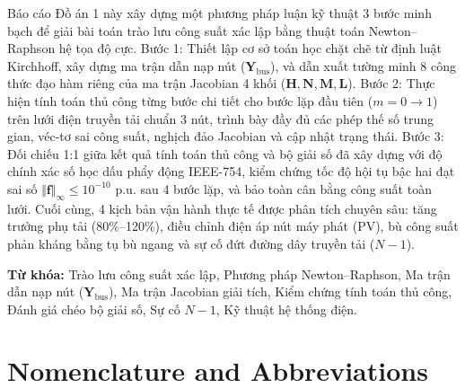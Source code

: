 \documentclass[12pt,a4paper,oneside]{report}
\begin{document}
Báo cáo Đồ án 1 này xây dựng một phương pháp luận kỹ thuật 3 bước minh bạch để giải bài toán trào lưu công suất xác lập bằng thuật toán Newton--Raphson hệ tọa độ cực. Bước 1: Thiết lập cơ sở toán học chặt chẽ từ định luật Kirchhoff, xây dựng ma trận dẫn nạp nút ($\mathbf{Y}_{\text{bus}}$), và dẫn xuất tường minh 8 công thức đạo hàm riêng của ma trận Jacobian 4 khối ($\mathbf{H}, \mathbf{N}, \mathbf{M}, \mathbf{L}$). Bước 2: Thực hiện tính toán thủ công từng bước chi tiết cho bước lặp đầu tiên ($m = 0 \to 1$) trên lưới điện truyền tải chuẩn 3 nút, trình bày đầy đủ các phép thế số trung gian, véc-tơ sai công suất, nghịch đảo Jacobian và cập nhật trạng thái. Bước 3: Đối chiếu 1:1 giữa kết quả tính toán thủ công và bộ giải số đã xây dựng với độ chính xác số học dấu phẩy động IEEE-754, kiểm chứng tốc độ hội tụ bậc hai đạt sai số $\Vert \mathbf{f} \Vert_\infty \le 10^{-10}\text{ p.u.}$ sau 4 bước lặp, và bảo toàn cân bằng công suất toàn lưới. Cuối cùng, 4 kịch bản vận hành thực tế được phân tích chuyên sâu: tăng trưởng phụ tải (80\%--120\%), điều chỉnh điện áp nút máy phát (PV), bù công suất phản kháng bằng tụ bù ngang và sự cố đứt đường dây truyền tải ($N-1$).

\vspace{10pt}
\noindent \textbf{Từ khóa:} Trào lưu công suất xác lập, Phương pháp Newton--Raphson, Ma trận dẫn nạp nút ($\mathbf{Y}_{\text{bus}}$), Ma trận Jacobian giải tích, Kiểm chứng tính toán thủ công, Đánh giá chéo bộ giải số, Sự cố $N-1$, Kỹ thuật hệ thống điện.

\clearpage

\chapter*{Nomenclature and Abbreviations}
\end{document}
